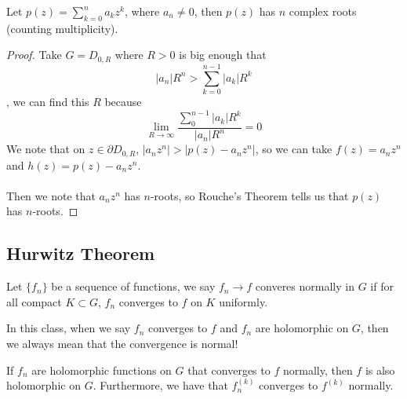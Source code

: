\documentclass{article}
\begin{document}
\begin{corollary}
Let $p(z) = \sum_{k = 0}^n a_k z^k$, where $a_n \neq 0$, then $p(z)$ has $n$ complex roots (counting multiplicity).
\end{corollary}

\begin{proof}
Take $G = D_{0, R}$ where $R > 0$ is big enough that
\[|a_n| R^n > \sum_{k = 0}^{n-1} |a_k| R^k\]
, we can find this $R$ because
\[\lim_{R \to \infty} \frac{\sum_{0}^{n-1} |a_k| R^k}{|a_n| R^n} = 0\]
We note that on $z \in \partial D_{0, R}$, $|a_n z^n| > |p(z) - a_n z^n|$, so we can take $f(z) = a_n z^n$ and $h(z) = p(z) - a_n z^n$.\\\\
Then we note that $a_n z^n$ has $n$-roots, so Rouche's Theorem tells us that $p(z)$ has $n$-roots.
\end{proof}

\subsection{Hurwitz Theorem}

\begin{definition}
Let $\{f_n\}$ be a sequence of functions, we say $f_n \to f$ converes normally in $G$ if for all compact $K \subset G$, $f_n$ converges to $f$ on $K$ uniformly.
\end{definition}

In this class, when we say $f_n$ converges to $f$ and $f_n$ are holomorphic on $G$, then we always mean that the convergence is normal!

\begin{proposition}
If $f_n$ are holomorphic functions on $G$ that converges to $f$ normally, then $f$ is also holomorphic on $G$. Furthermore, we have that $f_n^{(k)}$ converges to $f^{(k)}$ normally.
\end{proposition}
\end{document}
